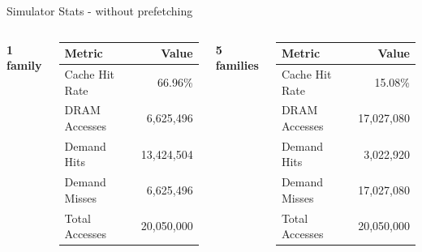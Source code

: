\documentclass[Serif, 10pt, brown]{beamer}
\theoremstyle{example}
\theoremstyle{plain}
\begin{document}
\begin{frame}{Simulator Stats - without prefetching}
\begin{columns}
    \centering
    \textbf{1 family}
    
    \vspace{2mm}
    
    {\scriptsize \begin{tabular}{|l|r|}
        \hline
        Metric & Value \\
        \hline
        Cache Hit Rate & 66.96\% \\
        DRAM Accesses & 6,625,496 \\
        Demand Hits & 13,424,504 \\
        Demand Misses & 6,625,496 \\
        Total Accesses & 20,050,000 \\
        \hline
    \end{tabular}}

    \centering
    \textbf{5 families}
    
    \vspace{2mm}
    
    {\scriptsize \begin{tabular}{|l|r|}
        \hline
        Metric & Value \\
        \hline
        Cache Hit Rate & 15.08\% \\
        DRAM Accesses & 17,027,080 \\
        Demand Hits & 3,022,920 \\
        Demand Misses & 17,027,080 \\
        Total Accesses & 20,050,000 \\
        \hline
    \end{tabular}}

\end{columns}

\vspace{3mm}

\centering
\small
\end{frame}
\end{document}
